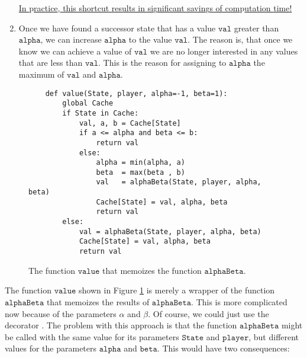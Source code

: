 \begin{enumerate}
      \underline{In }p\underline{ractice},\underline{ this shortcut results in si}g\underline{nificant savin}g\underline{s of com}p\underline{utation time!}
\item Once we have found a successor state that has a value $\texttt{val}$ greater than $\texttt{alpha}$,
      we can increase $\texttt{alpha}$ to the value $\texttt{val}$.  The reason is, that once we know we can
      achieve a value of $\texttt{val}$ we are no longer interested in any values that are less than $\texttt{val}$.
      This is the reason for assigning to $\texttt{alpha}$ the maximum of $\texttt{val}$ and $\texttt{alpha}$.
\end{enumerate}

\begin{figure}[!ht]
\centering
\begin{verbatim}
    def value(State, player, alpha=-1, beta=1):
        global Cache
        if State in Cache:
            val, a, b = Cache[State]
            if a <= alpha and beta <= b:
                return val
            else:
                alpha = min(alpha, a)
                beta  = max(beta , b)
                val   = alphaBeta(State, player, alpha, beta)
                Cache[State] = val, alpha, beta
                return val
        else:
            val = alphaBeta(State, player, alpha, beta)
            Cache[State] = val, alpha, beta
            return val                
\end{verbatim}
\caption{The function $\mathtt{value}$ that memoizes the function $\mathtt{alphaBeta}$.}
\label{fig:Alpha-Beta-Pruning.ipynb:value}
\end{figure}
The function $\texttt{value}$ shown in Figure \ref{fig:Alpha-Beta-Pruning.ipynb:value} is merely a wrapper of
the function $\mathtt{alphaBeta}$ that memoizes the results of $\mathtt{alphaBeta}$.  This is more complicated
now because of the parameters $\alpha$ and $\beta$.  Of course, we could just use the decorator
\texttt{\@memoize}.  The problem with this approach is that the function $\mathtt{alphaBeta}$ might be called
with the same value for its parameters $\mathtt{State}$ and $\mathtt{player}$, but different values for the
parameters $\mathtt{alpha}$ and $\mathtt{beta}$.  This would have two consequences:
